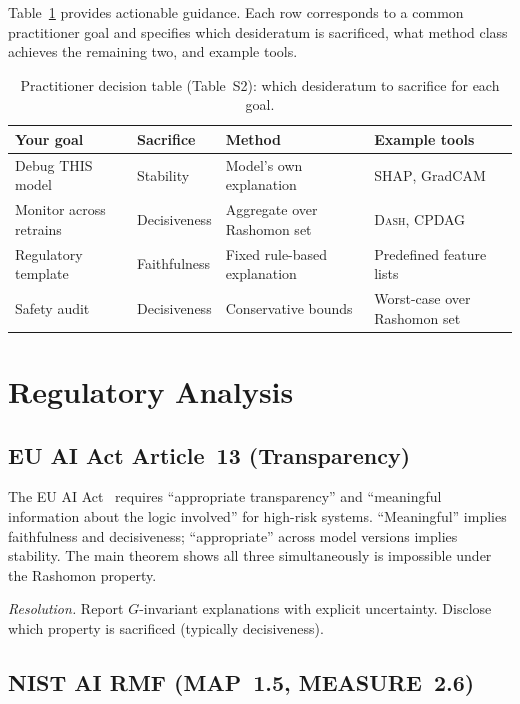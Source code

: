 \documentclass[11pt]{article}
\newcommand{\SHAP}{\textsc{SHAP}}
\newcommand{\DASH}{\textsc{Dash}}
\begin{document}
Table~\ref{tab:practitioner} provides actionable guidance. Each row
corresponds to a common practitioner goal and specifies which desideratum
is sacrificed, what method class achieves the remaining two, and example
tools.

\begin{table}[h]
\centering
\caption{Practitioner decision table (Table~S2): which desideratum to sacrifice for
each goal.}
\label{tab:practitioner}
\small
\begin{tabular}{@{}llll@{}}
\toprule
Your goal & Sacrifice & Method & Example tools \\
\midrule
Debug THIS model & Stability & Model's own explanation & \SHAP{}, GradCAM \\
Monitor across retrains & Decisiveness & Aggregate over Rashomon set & \DASH{}, CPDAG \\
Regulatory template & Faithfulness & Fixed rule-based explanation & Predefined feature lists \\
Safety audit & Decisiveness & Conservative bounds & Worst-case over Rashomon set \\
\bottomrule
\end{tabular}
\end{table}

\section{Regulatory Analysis}
\label{sec:si-regulatory}

\subsection{EU AI Act Article~13 (Transparency)}

The EU AI Act~\cite{euaiact2024} requires ``appropriate transparency'' and
``meaningful information about the logic involved'' for high-risk systems.
``Meaningful'' implies faithfulness and decisiveness; ``appropriate'' across
model versions implies stability. The main theorem shows all three
simultaneously is impossible under the Rashomon property.

\emph{Resolution.} Report $G$-invariant explanations with explicit
uncertainty. Disclose which property is sacrificed (typically
decisiveness).

\subsection{NIST AI RMF (MAP~1.5, MEASURE~2.6)}
\end{document}
